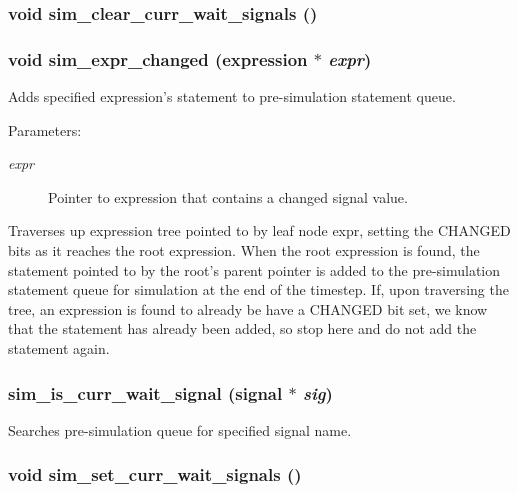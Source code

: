 \subsubsection{\setlength{\rightskip}{0pt plus 5cm}void sim\_\-clear\_\-curr\_\-wait\_\-signals ()}\label{sim_8h_a3}


\subsubsection{\setlength{\rightskip}{0pt plus 5cm}void sim\_\-expr\_\-changed ({\bf expression} $\ast$ {\em expr})}\label{sim_8h_a0}


Adds specified expression's statement to pre-simulation statement queue. 

\begin{Desc}
\item[Parameters:]
\begin{description}
\item[{\em expr}]Pointer to expression that contains a changed signal value.\end{description}
\end{Desc}
Traverses up expression tree pointed to by leaf node expr, setting the CHANGED bits as it reaches the root expression. When the root expression is found, the statement pointed to by the root's parent pointer is added to the pre-simulation statement queue for simulation at the end of the timestep. If, upon traversing the tree, an expression is found to already be have a CHANGED bit set, we know that the statement has already been added, so stop here and do not add the statement again. 
\subsubsection{ sim\_\-is\_\-curr\_\-wait\_\-signal ({\bf signal} $\ast$ {\em sig})}\label{sim_8h_a4}


Searches pre-simulation queue for specified signal name. 

\subsubsection{\setlength{\rightskip}{0pt plus 5cm}void sim\_\-set\_\-curr\_\-wait\_\-signals ()}\label{sim_8h_a2}



